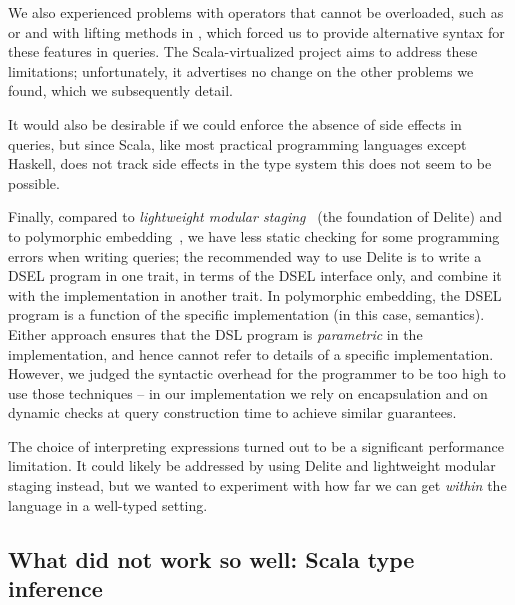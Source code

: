 We also experienced problems with operators that cannot be overloaded, such as \code{==} or  and with lifting methods in , which forced us to provide alternative syntax for these features in queries. The  Scala-virtualized project \citep{Moors12Virtualized} aims to address these limitations; unfortunately, it advertises no change on the other problems we found, which we subsequently detail.


It would also be desirable if we could enforce the absence of side effects in queries, but since Scala, like most practical programming languages except Haskell, does not track side effects in the type system this does not seem to be possible. 

Finally, compared to \emph{lightweight modular staging}~\citep{rompf2010lightweight} (the foundation of Delite) and to polymorphic embedding~\citep{hofer08polymorphic}, we have less static checking for some programming errors when writing queries; the recommended way to use Delite is to write a DSEL program in one trait, in terms of the DSEL interface only, and combine it with the implementation in another trait. In polymorphic embedding, the DSEL program is a function of the specific implementation (in this case, semantics).
Either approach ensures that the DSL program is \emph{parametric} in the implementation, and hence cannot refer to details of a specific implementation.
However, we judged the syntactic overhead for the programmer to be too high to use those techniques -- in our implementation we rely on encapsulation and on dynamic checks at query construction time to achieve similar guarantees.

The choice of interpreting expressions turned out to be a significant performance limitation. It could likely be addressed by using Delite and lightweight modular staging instead, but we wanted to experiment with how far we can get \emph{within} the language in a well-typed setting.


\subsection{What did not work so well: Scala type inference}
\label{sec:ScalaLessons}

